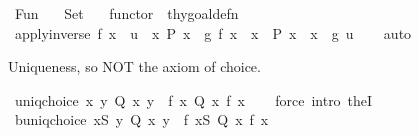 %
\begin{isabellebody}%
%
%
\isadelimdocument
%
\endisadelimdocument
%
\isatagdocument
%
\isamarkuptrue%
%
\endisatagdocument
{\isafolddocument}%
%
\isadelimdocument
%
\endisadelimdocument
%
\isadelimtheory
%
\endisadelimtheory
%
\isatagtheory
{}\isamarkupfalse%
\ Fun\isanewline
\ \ \ Set\isanewline
\ \ \ {\isachardoublequoteopen}functor{\isachardoublequoteclose}\ {\isacharcolon}{\kern0pt}{\isacharcolon}{\kern0pt}\ thy{\isacharunderscore}{\kern0pt}goal{\isacharunderscore}{\kern0pt}defn\isanewline
{}%
\endisatagtheory
{\isafoldtheory}%
%
\isadelimtheory
\isanewline
%
\endisadelimtheory
\isanewline
{}\isamarkupfalse%
\ apply{\isacharunderscore}{\kern0pt}inverse{\isacharcolon}{\kern0pt}\ {\isachardoublequoteopen}f\ x\ {\isacharequal}{\kern0pt}\ u\ {\isasymLongrightarrow}\ {\isacharparenleft}{\kern0pt}{\isasymAnd}x{\isachardot}{\kern0pt}\ P\ x\ {\isasymLongrightarrow}\ g\ {\isacharparenleft}{\kern0pt}f\ x{\isacharparenright}{\kern0pt}\ {\isacharequal}{\kern0pt}\ x{\isacharparenright}{\kern0pt}\ {\isasymLongrightarrow}\ P\ x\ {\isasymLongrightarrow}\ x\ {\isacharequal}{\kern0pt}\ g\ u{\isachardoublequoteclose}\isanewline
%
\isadelimproof
\ \ %
\endisadelimproof
%
\isatagproof
{}\isamarkupfalse%
\ auto%
\endisatagproof
{\isafoldproof}%
%
\isadelimproof
%
\endisadelimproof
%
\begin{isamarkuptext}%
Uniqueness, so NOT the axiom of choice.%
\end{isamarkuptext}\isamarkuptrue%
\isamarkupfalse%
\ uniq{\isacharunderscore}{\kern0pt}choice{\isacharcolon}{\kern0pt}\ {\isachardoublequoteopen}{\isasymforall}x{\isachardot}{\kern0pt}\ {\isasymexists}{\isacharbang}{\kern0pt}y{\isachardot}{\kern0pt}\ Q\ x\ y\ {\isasymLongrightarrow}\ {\isasymexists}f{\isachardot}{\kern0pt}\ {\isasymforall}x{\isachardot}{\kern0pt}\ Q\ x\ {\isacharparenleft}{\kern0pt}f\ x{\isacharparenright}{\kern0pt}{\isachardoublequoteclose}\isanewline
%
\isadelimproof
\ \ %
\endisadelimproof
%
\isatagproof
{}\isamarkupfalse%
\ {\isacharparenleft}{\kern0pt}force\ intro{\isacharcolon}{\kern0pt}\ theI{\isacharprime}{\kern0pt}{\isacharparenright}{\kern0pt}%
\endisatagproof
{\isafoldproof}%
%
\isadelimproof
\isanewline
%
\endisadelimproof
\isanewline
{}\isamarkupfalse%
\ b{\isacharunderscore}{\kern0pt}uniq{\isacharunderscore}{\kern0pt}choice{\isacharcolon}{\kern0pt}\ {\isachardoublequoteopen}{\isasymforall}x{\isasymin}S{\isachardot}{\kern0pt}\ {\isasymexists}{\isacharbang}{\kern0pt}y{\isachardot}{\kern0pt}\ Q\ x\ y\ {\isasymLongrightarrow}\ {\isasymexists}f{\isachardot}{\kern0pt}\ {\isasymforall}x{\isasymin}S{\isachardot}{\kern0pt}\ Q\ x\ {\isacharparenleft}{\kern0pt}f\ x{\isacharparenright}{\kern0pt}{\isachardoublequoteclose}\isanewline

\end{isabellebody}
